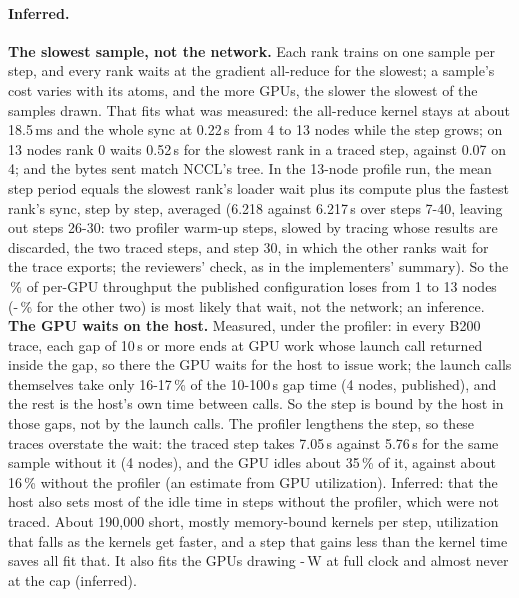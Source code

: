 \paragraph{Inferred.} \textbf{The slowest sample, not the network.} Each rank trains on one sample per step, and every rank waits at the gradient all-reduce for the slowest; a sample's cost varies with its atoms, and the more GPUs, the slower the slowest of the samples drawn. That fits what was measured: the all-reduce kernel stays at about 18.5\,ms and the whole sync at 0.22\,s from 4 to 13 nodes while the step grows; on 13 nodes rank 0 waits 0.52\,s for the slowest rank in a traced step, against 0.07 on 4; and the bytes sent match NCCL's tree. In the 13-node profile run, the mean step period equals the slowest rank's loader wait plus its compute plus the fastest rank's sync, step by step, averaged (6.218 against 6.217\,s over steps 7-40, leaving out steps 26-30: two profiler warm-up steps, slowed by tracing whose results are discarded, the two traced steps, and step 30, in which the other ranks wait for the trace exports; the reviewers' check, as in the implementers' summary). So the \TriOfLossPub\,\% of per-GPU throughput the published configuration loses from 1 to 13 nodes (\TriOfLossLo-\TriOfLossHi\,\% for the other two) is most likely that wait, not the network; an inference. \textbf{The GPU waits on the host.} Measured, under the profiler: in every B200 trace, each gap of 10\,\textmu s or more ends at GPU work whose launch call returned inside the gap, so there the GPU waits for the host to issue work; the launch calls themselves take only 16-17\,\% of the 10-100\,\textmu s gap time (4 nodes, published), and the rest is the host's own time between calls. So the step is bound by the host in those gaps, not by the launch calls. The profiler lengthens the step, so these traces overstate the wait: the traced step takes 7.05\,s against 5.76\,s for the same sample without it (4 nodes), and the GPU idles about 35\,\% of it, against about 16\,\% without the profiler (an estimate from GPU utilization). Inferred: that the host also sets most of the idle time in steps without the profiler, which were not traced. About 190,000 short, mostly memory-bound kernels per step, utilization that falls as the kernels get faster, and a step that gains less than the kernel time saves all fit that. It also fits the GPUs drawing \TriOfPowerCueq-\TriOfPowerPub\,W at full clock and almost never at the cap (inferred).

